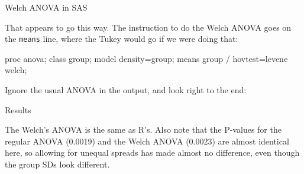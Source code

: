 \documentclass[unknownkeysallowed]{beamer}\usepackage[]{graphicx}\usepackage[]{color}
\begin{document}
\begin{frame}[fragile]{Welch ANOVA in SAS}
  
That appears to go this way. The instruction to do the Welch ANOVA
goes on the \texttt{means} line, where the Tukey would go if we were
doing that:

\begin{Sascode}[store=jc]
proc anova;
  class group;
  model density=group;
  means group / hovtest=levene welch;
\end{Sascode}

Ignore the usual ANOVA in the output, and look right to the end:
  
\end{frame}

\begin{frame}[fragile]{Results}
  

The Welch's ANOVA is the same as R's. Also note that the P-values for
the regular ANOVA (0.0019) and the Welch ANOVA (0.0023) are almost
identical here, so allowing for unequal spreads has made almost no
difference, even though the group SDs look different.
  
\end{frame}
\end{document}
